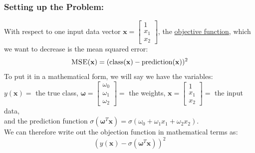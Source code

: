 \documentclass{article} %
\begin{document}
\subsubsection*{Setting up the Problem:}
With respect to one input data vector $\mathbf{x}=\begin{bmatrix}1\\x_{1}\\x_{2}\end{bmatrix}$, the \underline{objective function}, which we want to decrease is the mean squared error:
\begin{equation*}
    \textsc{MSE}(\mathbf{x}) = (\text{class}(\mathbf{x})-\text{prediction}(\mathbf{x}))^{2} 
\end{equation*}
\linebreak
To put it in a mathematical form, we will say we have the variables:\\
\linebreak
$y(\mathbf{x})=$ the true class, $\boldsymbol{\omega}=\begin{bmatrix}\omega_{0}\\\omega_{1}\\\omega_{2}\end{bmatrix}=$ the weights, $\mathbf{x}=\begin{bmatrix}1\\x_{1}\\x_{2}\end{bmatrix}=$ the input data,\\
\linebreak
and the prediction function $\sigma(\boldsymbol{\omega}^{T}\mathbf{x})=\sigma(\omega_{0}+\omega_{1}x_{1}+\omega_{2}x_{2})$.\\
\linebreak
We can therefore write out the objection function in mathematical terms as:
\begin{equation*}
    (y(\mathbf{x})-\sigma(\boldsymbol{\omega}^{T}\mathbf{x}))^{2}
\end{equation*}
\end{document}

